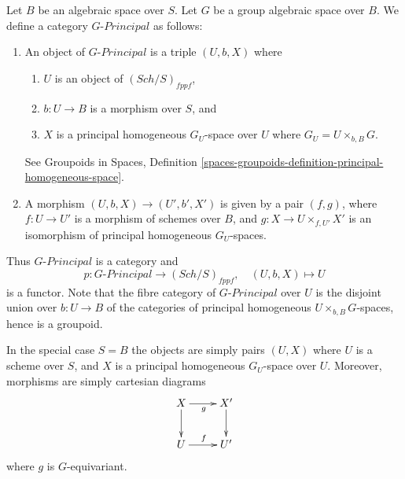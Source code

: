 \documentclass{stacks-project}
\theoremstyle{plain}
\theoremstyle{definition}
\theoremstyle{remark}
\numberwithin{equation}{subsection}
\def\Sch{\mathit{Sch}}
\begin{document}
\noindent
Let $B$ be an algebraic space over $S$.
Let $G$ be a group algebraic space over $B$.
We define a category $G\textit{-Principal}$ as follows:
\begin{enumerate}
\item An object of $G\textit{-Principal}$ is a triple $(U, b, X)$ where
\begin{enumerate}
\item $U$ is an object of $(\Sch/S)_{fppf}$,
\item $b : U \to B$ is a morphism over $S$, and
\item $X$ is a principal homogeneous $G_U$-space over $U$ where
$G_U = U \times_{b, B} G$.
\end{enumerate}
See
Groupoids in Spaces,
Definition \ref{spaces-groupoids-definition-principal-homogeneous-space}.
\item A morphism $(U, b, X) \to (U', b', X')$ is given
by a pair $(f, g)$, where $f : U \to U'$ is a morphism of schemes
over $B$, and $g : X \to U \times_{f, U'} X'$ is an
isomorphism of principal homogeneous $G_U$-spaces.
\end{enumerate}
Thus $G\textit{-Principal}$ is a category and
$$
p : G\textit{-Principal} \longrightarrow (\Sch/S)_{fppf},
\quad
(U, b, X) \longmapsto U
$$
is a functor. Note that the fibre category of $G\textit{-Principal}$
over $U$ is the disjoint union over $b : U \to B$
of the categories of principal homogeneous $U \times_{b, B} G$-spaces,
hence is a groupoid.

\medskip\noindent
In the special case $S = B$ the objects are simply pairs
$(U, X)$ where $U$ is a scheme over $S$, and $X$ is a principal homogeneous
$G_U$-space over $U$. Moreover, morphisms are simply cartesian
diagrams
$$
\xymatrix{
X \ar[d] \ar[r]_g & X' \ar[d] \\
U \ar[r]^f & U'
}
$$
where $g$ is $G$-equivariant.
\end{document}
